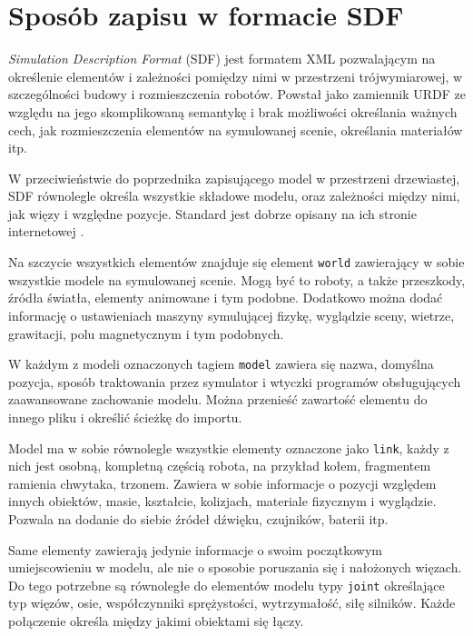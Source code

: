 \section{Sposób zapisu w formacie SDF}
\emph{Simulation Description Format} (SDF) jest formatem XML pozwalającym na określenie elementów i zależności pomiędzy nimi w przestrzeni trójwymiarowej, w szczególności budowy i rozmieszczenia robotów.
Powstał jako zamiennik URDF ze względu na jego skomplikowaną semantykę i brak możliwości określania ważnych cech, jak rozmieszczenia elementów na symulowanej scenie, określania materiałów itp.

W przeciwieństwie do poprzednika zapisującego model w przestrzeni drzewiastej, SDF równolegle określa wszystkie składowe modelu, oraz zależności między nimi, jak więzy i względne pozycje.
Standard jest dobrze opisany na ich stronie internetowej \cite{sdf_website}.

Na szczycie wszystkich elementów znajduje się element \texttt{world} zawierający w sobie wszystkie modele na symulowanej scenie.
Mogą być to roboty, a także przeszkody, źródła światła, elementy animowane i tym podobne.
Dodatkowo można dodać informację o ustawieniach maszyny symulującej fizykę, wyglądzie sceny, wietrze, grawitacji, polu magnetycznym i tym podobnych.

W każdym z modeli oznaczonych tagiem \texttt{model} zawiera się nazwa, domyślna pozycja, sposób traktowania przez symulator i wtyczki programów obsługujących zaawansowane zachowanie modelu.
Można przenieść zawartość elementu do innego pliku i określić ścieżkę do importu.

Model ma w sobie równolegle wszystkie elementy oznaczone jako \texttt{link}, każdy z nich jest osobną, kompletną częścią robota, na przykład kołem, fragmentem ramienia chwytaka, trzonem.
Zawiera w sobie informacje o pozycji względem innych obiektów, masie, kształcie, kolizjach, materiale fizycznym i wyglądzie.
Pozwala na dodanie do siebie źródeł dźwięku, czujników, baterii itp.

Same elementy zawierają jedynie informacje o swoim początkowym umiejscowieniu w modelu, ale nie o sposobie poruszania się i nałożonych więzach.
Do tego potrzebne są równoległe do elementów modelu typy \texttt{joint} określające typ więzów, osie, współczynniki sprężystości, wytrzymałość, siłę silników.
Każde połączenie określa między jakimi obiektami się łączy.

